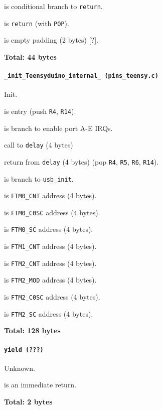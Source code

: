  is conditional branch to \texttt{return}.

 is \texttt{return} (with \texttt{POP}).

 is empty padding (2 bytes) [?].

\textbf{Total: 44 bytes}

\paragraph{\texttt{\_init\_Teensyduino\_internal\_ (pins\_teensy.c)}}
Init.

 is entry (push \texttt{R4}, \texttt{R14}).

 is branch to enable port A-E IRQs.

 call to \texttt{delay} (4 bytes)

 return from \texttt{delay} (4 bytes) (pop \texttt{R4},
\texttt{R5}, \texttt{R6}, \texttt{R14}).

 is branch to \texttt{usb\_init}.

\vspace{1em}

 is \texttt{FTM0\_CNT} address (4 bytes).

 is \texttt{FTM0\_C0SC} address (4 bytes).

 is \texttt{FTM0\_SC} address (4 bytes).

 is \texttt{FTM1\_CNT} address (4 bytes).

 is \texttt{FTM2\_CNT} address (4 bytes).

 is \texttt{FTM2\_MOD} address (4 bytes).

 is \texttt{FTM2\_C0SC} address (4 bytes).

 is \texttt{FTM2\_SC} address (4 bytes).

\textbf{Total: 128 bytes}

\paragraph{\texttt{yield (???)}} Unknown.

 is an immediate return.

\textbf{Total: 2 bytes}

